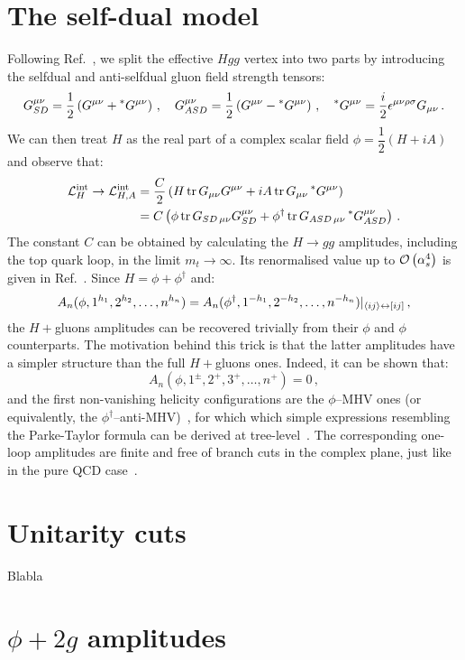 \documentclass[main.tex]{subfiles}
\begin{document}
\section{The self-dual model}
Following Ref.~\cite{Dixon:2004za}, we split the effective $Hgg$ vertex into two parts by introducing the selfdual and anti-selfdual gluon field strength tensors:
\begin{equation}
    G^{\mu\nu}_{SD} = \frac{1}{2} \left(G^{\mu\nu} + \prescript{\ast}{}{G}^{\mu\nu} \right)\,, \quad     G^{\mu\nu}_{ASD} = \frac{1}{2} \left(G^{\mu\nu} - \prescript{\ast}{}{G}^{\mu\nu} \right)\,, \quad\prescript{\ast}{}{G}^{\mu\nu} = \frac{i}{2} \epsilon^{\mu\nu\rho\sigma} G_{\mu\nu}\,.
\end{equation}
We can then treat $H$ as the real part of a complex scalar field $\phi = \dfrac{1}{2}(H+i A)$ and observe that:
\begin{align}
    \mathcal{L}_H^{\text{int}} \rightarrow \mathcal{L}_{H, A}^{\text{int}} &= \frac{C}{2} \left( H \operatorname{\rm tr} {G}_{\mu\nu}{G}^{\mu\nu} + iA \operatorname{\rm tr} {G}_{\mu\nu}\prescript{\ast}{}{G}^{\mu\nu}\right) \\
    &= C \left( \phi \operatorname{\rm tr} {G}_{SD\,\mu\nu}{G}_{SD}^{\mu\nu} + \phi^\dagger \operatorname{\rm tr} {G}_{ASD\,\mu\nu}\prescript{\ast}{}{G}_{ASD}^{\mu\nu}\right)\,.
\end{align} 
The constant $C$ can be obtained by calculating the $H \rightarrow gg$ amplitudes, including the top quark loop, in the limit $m_t \rightarrow \infty$. Its renormalised value up to $\mathcal{O}\left(\alpha_s^4\right)$ is given in Ref.~\cite{Chetyrkin:1997iv}. Since $H = \phi + \phi^\dagger$ and:
\begin{equation}
    A_n(\phi, 1^{h_1},2^{h_2}, \ldots, n^{h_n}) = A_n(\phi^\dagger, 1^{-h_1},2^{-h_2}, \ldots, n^{-h_n}) \rvert_{\langle ij\rangle \leftrightarrow [ij]} \,,
\end{equation}
the $H+$gluons amplitudes can be recovered trivially from their $\phi$ and $\phi$ counterparts. The motivation behind this trick is that the latter amplitudes have a simpler structure than the full $H+$gluons ones. Indeed, it can be shown that: 
\begin{equation}
    A_n(\phi, 1^\pm,2^+,3^+, \ldots, n^+) = 0 \,,
\end{equation}
and the first non-vanishing helicity configurations are the $\phi$--MHV ones (or equivalently, the $\phi^\dagger$--anti-MHV)~\cite{Berends:1988759}, for which which simple expressions resembling the Parke-Taylor formula can be derived at tree-level~\cite{Dixon:2004za}. The corresponding one-loop amplitudes  are finite and free of branch cuts in the complex plane, just like in the pure QCD case~\cite{Mahlon:1993si}. 

\section{Unitarity cuts}
Blabla

\section{$\phi + 2g$ amplitudes}
\end{document}
